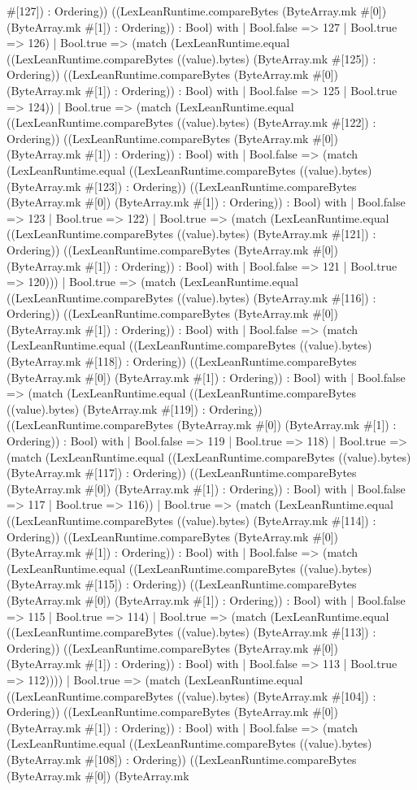 \documentclass[11pt]{article}
\begin{document}
\#[127]) : Ordering)) ((LexLeanRuntime.compareBytes (ByteArray.mk \#[0]) (ByteArray.mk \#[1]) : Ordering)) : Bool) with | Bool.false => 127 | Bool.true => 126) | Bool.true => (match (LexLeanRuntime.equal ((LexLeanRuntime.compareBytes ((value).bytes) (ByteArray.mk \#[125]) : Ordering)) ((LexLeanRuntime.compareBytes (ByteArray.mk \#[0]) (ByteArray.mk \#[1]) : Ordering)) : Bool) with | Bool.false => 125 | Bool.true => 124)) | Bool.true => (match (LexLeanRuntime.equal ((LexLeanRuntime.compareBytes ((value).bytes) (ByteArray.mk \#[122]) : Ordering)) ((LexLeanRuntime.compareBytes (ByteArray.mk \#[0]) (ByteArray.mk \#[1]) : Ordering)) : Bool) with | Bool.false => (match (LexLeanRuntime.equal ((LexLeanRuntime.compareBytes ((value).bytes) (ByteArray.mk \#[123]) : Ordering)) ((LexLeanRuntime.compareBytes (ByteArray.mk \#[0]) (ByteArray.mk \#[1]) : Ordering)) : Bool) with | Bool.false => 123 | Bool.true => 122) | Bool.true => (match (LexLeanRuntime.equal ((LexLeanRuntime.compareBytes ((value).bytes) (ByteArray.mk \#[121]) : Ordering)) ((LexLeanRuntime.compareBytes (ByteArray.mk \#[0]) (ByteArray.mk \#[1]) : Ordering)) : Bool) with | Bool.false => 121 | Bool.true => 120))) | Bool.true => (match (LexLeanRuntime.equal ((LexLeanRuntime.compareBytes ((value).bytes) (ByteArray.mk \#[116]) : Ordering)) ((LexLeanRuntime.compareBytes (ByteArray.mk \#[0]) (ByteArray.mk \#[1]) : Ordering)) : Bool) with | Bool.false => (match (LexLeanRuntime.equal ((LexLeanRuntime.compareBytes ((value).bytes) (ByteArray.mk \#[118]) : Ordering)) ((LexLeanRuntime.compareBytes (ByteArray.mk \#[0]) (ByteArray.mk \#[1]) : Ordering)) : Bool) with | Bool.false => (match (LexLeanRuntime.equal ((LexLeanRuntime.compareBytes ((value).bytes) (ByteArray.mk \#[119]) : Ordering)) ((LexLeanRuntime.compareBytes (ByteArray.mk \#[0]) (ByteArray.mk \#[1]) : Ordering)) : Bool) with | Bool.false => 119 | Bool.true => 118) | Bool.true => (match (LexLeanRuntime.equal ((LexLeanRuntime.compareBytes ((value).bytes) (ByteArray.mk \#[117]) : Ordering)) ((LexLeanRuntime.compareBytes (ByteArray.mk \#[0]) (ByteArray.mk \#[1]) : Ordering)) : Bool) with | Bool.false => 117 | Bool.true => 116)) | Bool.true => (match (LexLeanRuntime.equal ((LexLeanRuntime.compareBytes ((value).bytes) (ByteArray.mk \#[114]) : Ordering)) ((LexLeanRuntime.compareBytes (ByteArray.mk \#[0]) (ByteArray.mk \#[1]) : Ordering)) : Bool) with | Bool.false => (match (LexLeanRuntime.equal ((LexLeanRuntime.compareBytes ((value).bytes) (ByteArray.mk \#[115]) : Ordering)) ((LexLeanRuntime.compareBytes (ByteArray.mk \#[0]) (ByteArray.mk \#[1]) : Ordering)) : Bool) with | Bool.false => 115 | Bool.true => 114) | Bool.true => (match (LexLeanRuntime.equal ((LexLeanRuntime.compareBytes ((value).bytes) (ByteArray.mk \#[113]) : Ordering)) ((LexLeanRuntime.compareBytes (ByteArray.mk \#[0]) (ByteArray.mk \#[1]) : Ordering)) : Bool) with | Bool.false => 113 | Bool.true => 112)))) | Bool.true => (match (LexLeanRuntime.equal ((LexLeanRuntime.compareBytes ((value).bytes) (ByteArray.mk \#[104]) : Ordering)) ((LexLeanRuntime.compareBytes (ByteArray.mk \#[0]) (ByteArray.mk \#[1]) : Ordering)) : Bool) with | Bool.false => (match (LexLeanRuntime.equal ((LexLeanRuntime.compareBytes ((value).bytes) (ByteArray.mk \#[108]) : Ordering)) ((LexLeanRuntime.compareBytes (ByteArray.mk \#[0]) (ByteArray.mk 
\end{document}
